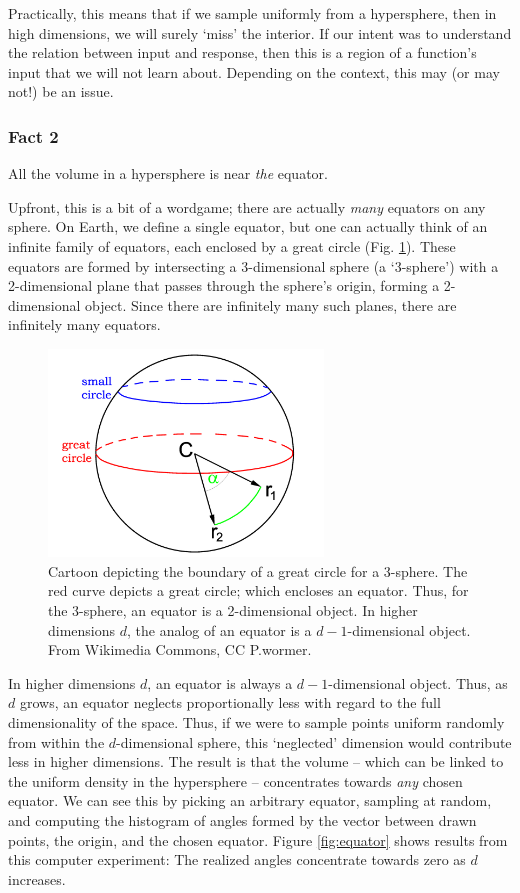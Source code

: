 \documentclass{article}
\begin{document}
Practically, this means that if we sample uniformly from a hypersphere, then in
high dimensions, we will surely `miss' the interior. If our intent was to
understand the relation between input and response, then this is a region of a
function's input that we will not learn about. Depending on the context, this
may (or may not!) be an issue.

\clearpage
\subsubsection{Fact 2} All the volume in a hypersphere is near
\emph{the} equator.

\bigskip
Upfront, this is a bit of a wordgame; there are actually \emph{many} equators on
any sphere. On Earth, we define a single equator, but one can actually think of
an infinite family of equators, each enclosed by a great circle (Fig.
\ref{fig:great-circle}). These equators are formed by intersecting a
3-dimensional sphere (a `3-sphere') with a 2-dimensional plane that passes
through the sphere's origin, forming a 2-dimensional object. Since there are
infinitely many such planes, there are infinitely many equators.

\begin{figure}[!ht]
  \centering
  \includegraphics[width=0.65\textwidth]{../../images/great_circle}
  \caption{Cartoon depicting the boundary of a great circle for a 3-sphere. The
    red curve depicts a great circle; which encloses an equator. Thus, for the
    3-sphere, an equator is a 2-dimensional object. In higher dimensions $d$,
    the analog of an equator is a $d-1$-dimensional object. From Wikimedia
    Commons, CC P.wormer.}
  \label{fig:great-circle}
\end{figure}

In higher dimensions $d$, an equator is always a $d-1$-dimensional object. Thus,
as $d$ grows, an equator neglects proportionally less with regard to the full
dimensionality of the space. Thus, if we were to sample points uniform randomly
from within the $d$-dimensional sphere, this `neglected' dimension would
contribute less in higher dimensions. The result is that the volume -- which can
be linked to the uniform density in the hypersphere -- concentrates towards
\emph{any} chosen equator. We can see this by picking an arbitrary equator,
sampling at random, and computing the histogram of angles formed by the vector
between drawn points, the origin, and the chosen equator. Figure
\ref{fig:equator} shows results from this computer experiment: The realized
angles concentrate towards zero as $d$ increases.
\end{document}
